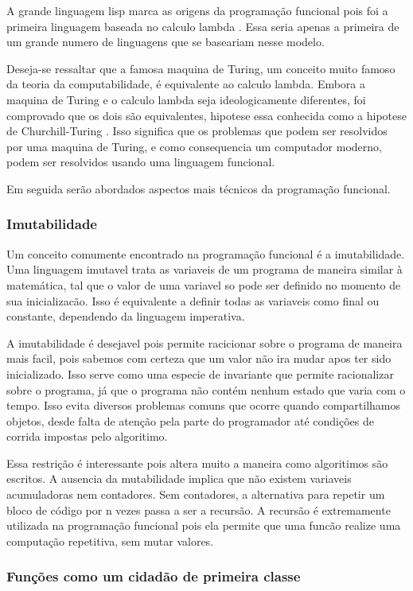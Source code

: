A grande linguagem lisp marca as origens da programação funcional pois foi a primeira linguagem baseada no calculo lambda \cite{graham}.
Essa seria apenas a primeira de um grande numero de linguagens que se baseariam nesse modelo.

Deseja-se ressaltar que a famosa maquina de Turing, um conceito muito famoso da teoria da computabilidade, é equivalente ao calculo lambda.
Embora a maquina de Turing e o calculo lambda seja ideologicamente diferentes, foi comprovado que os dois são equivalentes, hipotese essa conhecida como a hipotese de Churchill-Turing \cite{computability}.
Isso significa que os problemas que podem ser resolvidos por uma maquina de Turing, e como consequencia um computador moderno, podem ser resolvidos usando uma linguagem funcional.

Em seguida serão abordados aspectos mais técnicos da programação funcional.

\subsubsection{Imutabilidade}

Um conceito comumente encontrado na programação funcional é a imutabilidade.
Uma linguagem imutavel trata as variaveis de um programa de maneira similar à matemática, tal que o valor de uma variavel so pode ser definido no momento de sua inicializacão. 
Isso é equivalente a definir todas as variaveis como final ou constante, dependendo da linguagem imperativa.

A imutabilidade é desejavel pois permite racicionar sobre o programa de maneira mais facil, pois sabemos com certeza que um valor não ira mudar apos ter sido inicializado.
Isso serve como uma especie de invariante que permite racionalizar sobre o programa, já que o programa não contém nenhum estado que varia com o tempo.
Isso evita diversos problemas comuns que ocorre quando compartilhamos objetos, desde falta de atenção pela parte do programador até condições de corrida impostas pelo algoritimo.

Essa restrição é interessante pois altera muito a maneira como algoritimos são escritos.
A ausencia da mutabilidade implica que não existem variaveis acumuladoras nem contadores.
Sem contadores, a alternativa para repetir um bloco de código por n vezes passa a ser a recursão.
A recursão é extremamente utilizada na programação funcional pois ela permite que uma funcão realize uma computação repetitiva, sem mutar valores.

\subsubsection{Funções como um cidadão de primeira classe}

